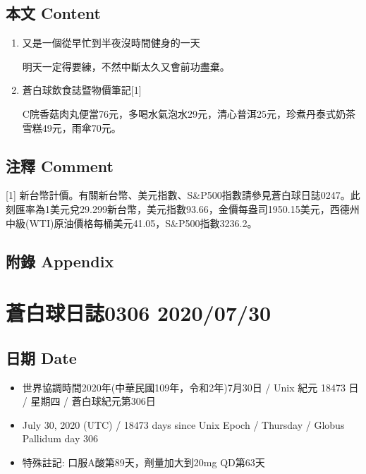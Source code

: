 \documentclass[a5paper, 11pt
]{book}
\providecommand{\tightlist}{%
  \setlength{\itemsep}{0pt}\setlength{\parskip}{0pt}}
\begin{document}
\hypertarget{ux672cux6587-content-50}{%
\subsection{本文 Content}\label{ux672cux6587-content-50}}

\begin{enumerate}
\def\labelenumi{\arabic{enumi}.}
\item
  又是一個從早忙到半夜沒時間健身的一天

  明天一定得要練，不然中斷太久又會前功盡棄。
\item
  蒼白球飲食誌暨物價筆記{[}1{]}

  C院香菇肉丸便當76元，多喝水氣泡水29元，清心普洱25元，珍煮丹泰式奶茶雪糕49元，雨傘70元。
\end{enumerate}

\hypertarget{ux6ce8ux91cb-comment-50}{%
\subsection{注釋 Comment}\label{ux6ce8ux91cb-comment-50}}

{[}1{]}
新台幣計價。有關新台幣、美元指數、S\&P500指數請參見蒼白球日誌0247。此刻匯率為1美元兌29.299新台幣，美元指數93.66，金價每盎司1950.15美元，西德州中級(WTI)原油價格每桶美元41.05，S\&P500指數3236.2。

\hypertarget{ux9644ux9304-appendix-50}{%
\subsection{附錄 Appendix}\label{ux9644ux9304-appendix-50}}

\hypertarget{ux84bcux767dux7403ux65e5ux8a8c0306-20200730}{%
\section{蒼白球日誌0306
2020/07/30}\label{ux84bcux767dux7403ux65e5ux8a8c0306-20200730}}

\hypertarget{ux65e5ux671f-date-51}{%
\subsection{日期 Date}\label{ux65e5ux671f-date-51}}

\begin{itemize}
\tightlist
\item
  世界協調時間2020年(中華民國109年，令和2年)7月30日 / Unix 紀元 18473 日
  / 星期四 / 蒼白球紀元第306日
\item
  July 30, 2020 (UTC) / 18473 days since Unix Epoch / Thursday / Globus
  Pallidum day 306
\item
  特殊註記: 口服A酸第89天，劑量加大到20mg QD第63天
\end{itemize}
\end{document}
